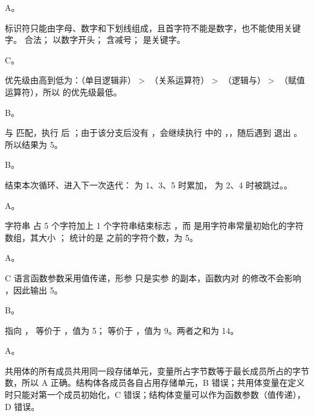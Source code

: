 \documentclass[a4paper,11pt]{article}
\begin{document}

\begin{qgroup}
\q A。
\begin{analysis}
标识符只能由字母、数字和下划线组成，且首字符不能是数字，也不能使用关键字。 合法； 以数字开头； 含减号； 是关键字。
\end{analysis}

\q C。
\begin{analysis}
优先级由高到低为：\code{!}（单目逻辑非）$>$ \code{!=}（关系运算符）$>$ \code{\&\&}（逻辑与）$>$ \code{=}（赋值运算符），所以 \code{=} 的优先级最低。
\end{analysis}

\q B。
\begin{analysis}
 与  匹配，执行  后 ；由于该分支后没有 ，会继续执行  中的 ，，随后遇到  退出 。所以结果为 5。
\end{analysis}

\q B。
\begin{analysis}
 结束本次循环、进入下一次迭代： 为 1、3、5 时累加， 为 2、4 时被跳过。。
\end{analysis}

\q A。
\begin{analysis}
字符串  占 5 个字符加上 1 个字符串结束标志 ，而  是用字符串常量初始化的字符数组，其大小 ； 统计的是  之前的字符个数，为 5。
\end{analysis}

\q A。
\begin{analysis}
C 语言函数参数采用值传递，形参  只是实参  的副本，函数内对  的修改不会影响 ，因此输出 5。
\end{analysis}

\q B。
\begin{analysis}
 指向 ， 等价于 ，值为 5； 等价于 ，值为 9。两者之和为 14。
\end{analysis}

\q A。
\begin{analysis}
共用体的所有成员共用同一段存储单元，变量所占字节数等于最长成员所占的字节数，所以 A 正确。结构体各成员各自占用存储单元，B 错误；共用体变量在定义时只能对第一个成员初始化，C 错误；结构体变量可以作为函数参数（值传递），D 错误。
\end{analysis}


\end{qgroup}
\end{document}
